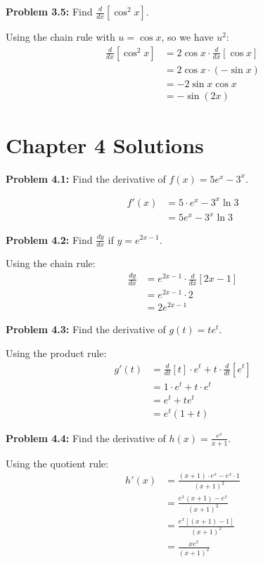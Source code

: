 \documentclass[12pt,a4paper]{book}
\theoremstyle{definition}
\begin{document}
\begin{solution}
\textbf{Problem 3.5:} Find $\frac{d}{dx}[\cos^2 x]$.

Using the chain rule with $u = \cos x$, so we have $u^2$:
\begin{align}
\frac{d}{dx}[\cos^2 x] &= 2\cos x \cdot \frac{d}{dx}[\cos x]\\
&= 2\cos x \cdot (-\sin x)\\
&= -2\sin x \cos x\\
&= -\sin(2x)
\end{align}
\end{solution}

\section*{Chapter 4 Solutions}

\begin{solution}
\textbf{Problem 4.1:} Find the derivative of $f(x) = 5e^x - 3^x$.

\begin{align}
f'(x) &= 5 \cdot e^x - 3^x \ln 3\\
&= 5e^x - 3^x \ln 3
\end{align}
\end{solution}

\begin{solution}
\textbf{Problem 4.2:} Find $\frac{dy}{dx}$ if $y = e^{2x - 1}$.

Using the chain rule:
\begin{align}
\frac{dy}{dx} &= e^{2x - 1} \cdot \frac{d}{dx}[2x - 1]\\
&= e^{2x - 1} \cdot 2\\
&= 2e^{2x - 1}
\end{align}
\end{solution}

\begin{solution}
\textbf{Problem 4.3:} Find the derivative of $g(t) = te^t$.

Using the product rule:
\begin{align}
g'(t) &= \frac{d}{dt}[t] \cdot e^t + t \cdot \frac{d}{dt}[e^t]\\
&= 1 \cdot e^t + t \cdot e^t\\
&= e^t + te^t\\
&= e^t(1 + t)
\end{align}
\end{solution}

\begin{solution}
\textbf{Problem 4.4:} Find the derivative of $h(x) = \frac{e^x}{x + 1}$.

Using the quotient rule:
\begin{align}
h'(x) &= \frac{(x + 1) \cdot e^x - e^x \cdot 1}{(x + 1)^2}\\
&= \frac{e^x(x + 1) - e^x}{(x + 1)^2}\\
&= \frac{e^x[(x + 1) - 1]}{(x + 1)^2}\\
&= \frac{xe^x}{(x + 1)^2}
\end{align}
\end{solution}
\end{document}
